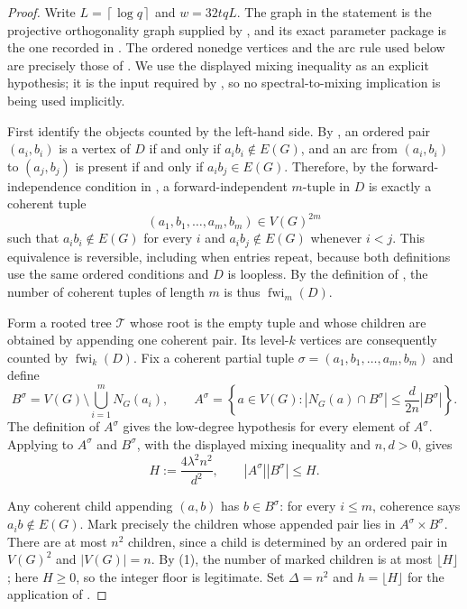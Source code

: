 \begin{proof}
Write $L=\left\lceil\log q\right\rceil$ and
$w=32tqL$.  The graph in the statement is the projective orthogonality
graph supplied by , and its exact parameter package is
the one recorded in .  The ordered nonedge
vertices and the arc rule used below are precisely those of
.  We use the displayed mixing inequality as an
explicit hypothesis; it is the input required by
, so no spectral-to-mixing implication is being used
implicitly.

First identify the objects counted by the left-hand side.  By
, an ordered pair $(a_i,b_i)$ is a vertex of $D$ if
and only if $a_i b_i\notin E(G)$, and an arc from $(a_i,b_i)$ to
$(a_j,b_j)$ is present if and only if $a_i b_j\in E(G)$.  Therefore, by the
forward-independence condition in , a
forward-independent $m$-tuple in $D$ is exactly a coherent tuple
\[
 (a_1,b_1,\ldots,a_m,b_m)\in V(G)^{2m}
\]
such that $a_i b_i\notin E(G)$ for every $i$ and
$a_i b_j\notin E(G)$ whenever $i<j$.  This equivalence is reversible,
including when entries repeat, because both definitions use the same
ordered conditions and $D$ is loopless.  By the definition of
, the number of coherent tuples of length
$m$ is thus $\operatorname{fwi}_m(D)$.

Form a rooted tree $\mathcal T$ whose root is the empty tuple and whose
children are obtained by appending one coherent pair.  Its level-$k$
vertices are consequently counted by $\operatorname{fwi}_k(D)$.  Fix a
coherent partial tuple
$\sigma=(a_1,b_1,\ldots,a_m,b_m)$ and define
\[
 B^\sigma=V(G)\setminus\bigcup_{i=1}^mN_G(a_i),\qquad
 A^\sigma=\left\{a\in V(G):
 |N_G(a)\cap B^\sigma|\leq\frac{d}{2n}|B^\sigma|\right\}.
\]
The definition of $A^\sigma$ gives the low-degree hypothesis for every
element of $A^\sigma$.  Applying  to $A^\sigma$
and $B^\sigma$, with the displayed mixing inequality and $n,d>0$, gives
\[
 H:=\frac{4\lambda^2n^2}{d^2},\qquad
 |A^\sigma||B^\sigma|\leq H. \tag{1}
\]

Any coherent child appending $(a,b)$ has $b\in B^\sigma$: for every
$i\leq m$, coherence says $a_i b\notin E(G)$.  Mark precisely the children
whose appended pair lies in $A^\sigma\times B^\sigma$.  There are at most
$n^2$ children, since a child is determined by an ordered pair in
$V(G)^2$ and $|V(G)|=n$.  By (1), the number of marked children is at most
$\lfloor H\rfloor$; here $H\geq0$, so the integer floor is legitimate.  Set
$\Delta=n^2$ and $h=\lfloor H\rfloor$ for the application of
.


\end{proof}
